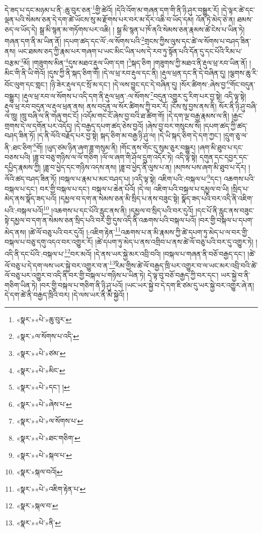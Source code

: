 དེ་ཟད་པ་དང་མཉམ་པ་ནི་:ཆུ་བུར་ཅན་\footnote{«སྣར་»«པེ་»ཆུ་བུར་}གྱི་ཚེའོ། །དེའི་འོག་མ་གཞན་དག་གི་ནི་ཉི་ཤུར་བསྒྱུར་རོ། །དེ་ལྟར་ཚེ་དང་ལྡན་པའི་སེམས་ཅན་དེ་དག་ཚེ་ཡོངས་སུ་མ་རྫོགས་པར་བར་མ་དོར་འཆི་བ་ཡོད་དམ། འོན་ཏེ་མེད་ཅེ་ན། ཐམས་ཅད་ལ་ཡོད་དེ། སྒྲ་མི་སྙན་མ་གཏོགས་པར་འཆི། །
སྒྲ་མི་སྙན་པ་ཁོ་ནའི་སེམས་ཅན་རྣམས་ཚེ་ངེས་པ་ཡིན་ཏེ། གཞན་དག་ནི་མ་ཡིན་ནོ། །དཔག་ཚད་དང་ལོ་:ལ་སོགས་པའི་\footnote{«སྣར་»ལ་སོགས་པ་འདི་}གྲངས་ཀྱིས་ལུས་དང་ཚེ་ལ་སོགས་པ་བཤད་ཟིན་ནས། ཡང་ཐམས་ཅད་ཀྱི་རྣམ་པར་གཞག་པ་ཡང་མིང་ཡིན་པས་དེ་རབ་ཏུ་སྟོན་པའི་དོན་དུ་དང་པོའི་རིམ་པ་བརྩམ་\footnote{«སྣར་»«པེ་»ཙམ་}མོ། །གཟུགས་མིན་\footnote{«སྣར་»«པེ་»མིང་}དུས་མཐའ་རྡུལ་ཡིག་དག །\footnote{«སྣར་»«པེ་»དང་། །}སྐད་ཅིག །གཟུགས་ཀྱི་མཐའ་ནི་རྡུལ་ཕྲ་རབ་ཡིན་ནོ། །མིང་གི་ནི་ཡི་གེའོ། །དུས་ཀྱི་ནི་སྐད་ཅིག་གོ། །དེ་ལ་ཕྲ་རབ་རྡུལ་དང་ནི། །རྡུལ་ཕྲན་དང་ནི་དེ་བཞིན་དུ། །ལྕགས་ཆུ་རི་བོང་ལུག་དང་གླང་། །ཉི་ཟེར་རྡུལ་དང་སྲོ་མ་དང་། །དེ་ལས་བྱུང་དང་དེ་བཞིན་དུ། །སོར་ཚིགས་:ཞེས་བྱ་\footnote{«སྣར་»«པེ་»ཞེས་པ་}གོང་བདུན་བསྒྱུར། །རྡུལ་ཕྲ་རབ་ལ་སོགས་པ་འདི་དག་ནི་རྡུལ་ཕྲན་:ལ་སོགས་\footnote{«སྣར་»«པེ་»ལ་སོགས་པ་}བདུན་འགྱུར་དུ་རིག་པར་བྱ་སྟེ། འདི་ལྟ་སྟེ། རྡུལ་ཕྲ་རབ་བདུན་ལ་རྡུལ་ཕྲན་ནས། ནས་བདུན་ལ་སོར་ཚིགས་ཀྱི་བར་རོ། །ངོས་སུ་བྱས་ནས་ནི། སོར་ནི་ཉི་ཤུ་བཞི་ལ་ཁྲུ། །ཁྲུ་བཞི་ལ་ནི་གཞུ་གང་ངོ། །འདོམ་གང་ངོ་ཞེས་བྱ་བའི་ཐ་ཚིག་གོ། །དེ་དག་ལྔ་བརྒྱ་རྣམས་ལ་ནི། །རྒྱང་གྲགས་དེ་ལ་དགོན་པར་འདོད། །དེ་བརྒྱད་དཔག་ཚད་ཅེས་བྱའོ། །ཞེས་བྱ་བར་གསུངས་སོ། །དཔག་ཚད་ཀྱི་ཚད་བཤད་ཟིན་ཏོ། །ད་ནི་ལོའི་བརྗོད་པར་བྱ་སྟེ། སྐད་ཅིག་མ་བརྒྱ་ཉི་ཤུ་ལ། །དེ་ཡི་སྐད་ཅིག་དེ་དག་ཀྱང་། །དྲུག་ཅུ་ལ་ནི་:ཐང་ཅིག་\footnote{«སྣར་»«པེ་»ཐང་གཅིག་}གོ། །ཡུད་ཙམ་ཉིན་ཞག་ཟླ་གསུམ་ནི། །གོང་ནས་གོང་དུ་སུམ་ཅུར་བསྒྱུར། །ཞག་མི་ཐུབ་པ་དང་བཅས་པའི། །ཟླ་བ་བཅུ་གཉིས་ལ་ལོ་གཅིག །ལོ་ལ་ཞག་གི་ཤོལ་དྲུག་འདོར་ཏེ། འདི་ལྟ་སྟེ། དགུན་དང་དབྱར་དང་དཔྱིད་རྣམས་ཀྱི། །ཟླ་བ་ཕྱེད་དང་གཉིས་འདས་ནས། །ཟླ་བ་ཕྱེད་ནི་ལུས་པ་ན། །མཁས་པས་ཞག་མི་ཐུབ་པ་དོར། །ལོའི་ཚད་བཤད་ཟིན་ཏོ། །བསྐལ་པ་རྣམ་པ་མང་བཤད་པ། །འདི་ལྟ་སྟེ། འཇིག་པའི་:བསྐལ་པ་\footnote{«སྣར་»«པེ་»སྐལ་པ་}དང་། འཆགས་པའི་བསྐལ་པ་དང་། བར་གྱི་བསྐལ་པ་དང་། བསྐལ་པ་ཆེན་པོའོ། །དེ་ལ། འཇིག་པའི་བསྐལ་པ་དམྱལ་བ་ཡི། །སྲིད་པ་མེད་ནས་སྣོད་ཟད་པའོ། །དམྱལ་བ་དག་ན་སེམས་ཅན་མི་སྲིད་པ་ནས་བཟུང་སྟེ། སྣོད་ཟད་པའི་བར་འདི་ནི་འཇིག་པའི་:བསྐལ་པའོ།\footnote{«སྣར་»སྐལ་བའོ།} །འཆགས་པ་དང་པོའི་རླུང་ནས་ནི། །དམྱལ་བ་སྲིད་པའི་བར་དུའོ། །དང་པོ་ནི་རླུང་ནས་བཟུང་སྟེ་དམྱལ་བ་དག་ན་སེམས་ཅན་སྲིད་པའི་བར་གྱི་དུས་འདི་ནི་འཆགས་པའི་བསྐལ་པའོ། །བར་གྱི་བསྐལ་པ་དཔག་མེད་ནས། །ཚེ་ལོ་བཅུ་པའི་བར་དུའོ། །:འཇིག་རྟེན་\footnote{«སྣར་»«པེ་»འཇིག་རྟེན་པ་}འཆགས་པ་ན་མི་རྣམས་ཀྱི་ཚེ་དཔག་ཏུ་མེད་པ་ལ་བར་གྱི་བསྐལ་པ་བཅུ་དགུ་འདའ་བར་འགྱུར་རོ། །ཚེ་དཔག་ཏུ་མེད་པ་ནས་འགྲིབ་པ་ནས་ཚེ་ལོ་བཅུ་པའི་བར་དུ་འགྱུར་ཏེ། །འདི་ནི་དང་པོའི་:བསྐལ་པ་\footnote{«སྣར་»སྐལ་བ་}བར་མའོ། །དེ་ནས་ཡར་སྐྱེ་མར་འབྲི་བའི། །བསྐལ་པ་གཞན་ནི་བཅོ་བརྒྱད་དང་། །ཚེ་ལོ་བཅུ་པ་དེ་དག་ལས་ཡར་སྐྱེ་བར་འགྱུར་བ་ན་\footnote{«སྣར་»«པེ་»ནི་}རིམ་གྱིས་ཚེ་ལོ་བརྒྱད་ཁྲི་པར་འགྱུར་བ་ལ་ཡང་མར་འབྲི་བའི་ཚེ་ལོ་བཅུ་པར་འགྱུར་བ་འདི་ནི་བར་གྱི་བསྐལ་པ་གཉིས་པ་ཡིན་ཏེ། དེ་ལྟ་བུ་བཅོ་བརྒྱད་ཀྱི་བར་དང་། ཡར་སྐྱེ་བ་ནི་གཅིག་ཡིན་ཏེ། །བར་གྱི་བསྐལ་པ་གཅིག་ནི་ཉི་ཤུ་པའོ། །ཡང་ཡར་སྐྱེ་བ་དེ་དག་ཇི་ཙམ་དུ་ཡར་སྐྱེ་བར་འགྱུར་ཞེ་ན། དེ་དག་ཚེ་ནི་བརྒྱད་ཁྲིའི་བར། །དེ་ལས་ཡར་ནི་མི་སྐྱེའོ། །
